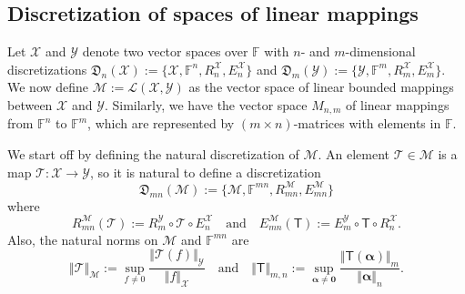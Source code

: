 \documentclass[a4paper]{paper}
\newcommand{\Discr}{\mathfrak{D}}
\newcommand{\VecSpace}[1]{\mathscr{#1}}
\newcommand{\Field}{\mathbb{F}}
\newcommand{\Op}[1]{\mathcal{#1}}
\newcommand{\DiscOp}[1]{\mathsf{#1}}
\newcommand*{\EXT}[2]{\ensuremath{E_{#1}^{#2}}}
\newcommand*{\REST}[2]{\ensuremath{R_{#1}^{#2}}}
\newcommand*{\RnX}{\ensuremath{\REST{n}{\VecSpace{X}}}}
\newcommand*{\RmX}{\ensuremath{\REST{m}{\VecSpace{X}}}}
\newcommand*{\RmY}{\ensuremath{\REST{m}{\VecSpace{Y}}}}
\newcommand*{\EnX}{\ensuremath{\EXT{n}{\VecSpace{X}}}}
\newcommand*{\EmX}{\ensuremath{\EXT{m}{\VecSpace{X}}}}
\newcommand*{\EmY}{\ensuremath{\EXT{m}{\VecSpace{Y}}}}
\newcommand{\vzero}{\boldsymbol{0}}
\newcommand{\valpha}{\boldsymbol{\alpha}}
\begin{document}
\subsection{Discretization of spaces of linear mappings}
Let $\VecSpace{X}$ and $\VecSpace{Y}$ denote two vector spaces over $\Field$ with 
$n$- and $m$-dimensional discretizations 
$\Discr_{n}(\VecSpace{X}) := \{ \VecSpace{X}, \Field^{n}, \RnX,\EnX \}$
and
    $\Discr_{m}(\VecSpace{Y}) := \{ \VecSpace{Y}, \Field^{m}, \RmX, \EmX \}$.
We now define $\VecSpace{M}:=\VecSpace{L}(\VecSpace{X},\VecSpace{Y})$ as the vector space of linear bounded mappings
between $\VecSpace{X}$ and $\VecSpace{Y}$. Similarly, we have the vector space $M_{n,m}$
of linear mappings from $\Field^{n}$ to $\Field^{m}$, which are represented by $(m \times n)$-matrices with elements in 
$\Field$.

We start off by defining the natural discretization of $\VecSpace{M}$. An element $\Op{T} \in \VecSpace{M}$
is a map $\Op{T} \colon \VecSpace{X} \to \VecSpace{Y}$, so it is natural to define a discretization 
\[ 
 \Discr_{m n}(\VecSpace{M}) := \{ \VecSpace{M}, \Field^{m n}, R_{m n}^{\VecSpace{M}},E_{m n}^{\VecSpace{M}} \} 
\]
where
\[ 
R_{m n}^{\VecSpace{M}}(\Op{T}) := \RmY \circ \Op{T} \circ \EnX 
\quad\text{and}\quad
E_{m n}^{\VecSpace{M}}(\DiscOp{T}) := \EmY \circ \DiscOp{T} \circ \RnX.
\]
Also, the natural norms on $\VecSpace{M}$ and $\Field^{mn}$ are 
\[  \Vert \Op{T} \Vert_{\VecSpace{M}} := \sup_{f \neq 0} \frac{\bigl\Vert \Op{T}(f) \bigr\Vert_{\VecSpace{Y}}}{\Vert f 
\Vert_{\VecSpace{X}}} 
   \quad\text{and}\quad
   \Vert \DiscOp{T} \Vert_{m,n} := \sup_{\valpha \neq \vzero} 
     \frac{\bigl\Vert \DiscOp{T}(\valpha) \bigr\Vert_{m}}{\Vert \valpha \Vert_{n}}. 
\]
\end{document}
